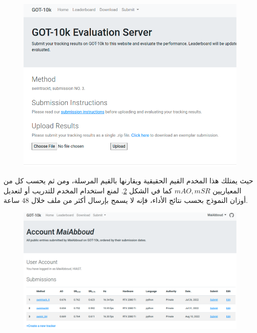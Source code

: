 \begin{figure}[H]
	\centerline{\includegraphics[width=\textwidth]{images/got10k_submit}}
	\caption{}
	\label{fig:got10k_submit}
\end{figure}
\vspace{-8.0mm}
\centerline{}	

حيث يمتلك هذا المخدم القيم الحقيقية ويقارنها بالقيم المرسلة، ومن ثم يحسب كل من المعياريين
$mAO,mSR$
كما في الشكل
\ref{fig:got10k_result_mai}.
\newline
لمنع استخدام المخدم للتدريب أو لتعديل أوزان النموذج بحسب نتائج الأداء، فإنه لا يسمح بإرسال أكثر من ملف خلال $48$ ساعة.
\begin{figure}[H]
	\centerline{\includegraphics[width=\textwidth]{images/got10k_result_mai}}
	\caption{}
	\label{fig:got10k_result_mai}
\end{figure}
\vspace{-8.0mm}
\centerline{}	

